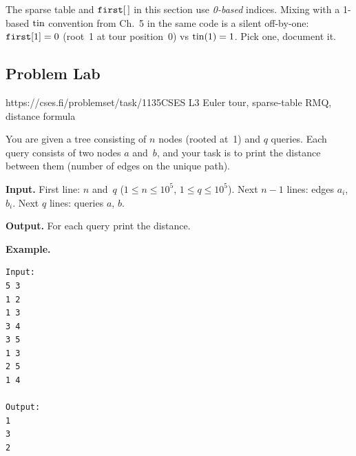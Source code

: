 \begin{warningbox}
The sparse table and \(\texttt{first}[\,]\) in this section use
\emph{0-based} indices.  Mixing with a 1-based \(\operatorname{tin}\) convention from
Ch.~5 in the same code is a silent off-by-one: \(\texttt{first}[1]=0\)
(root~1 at tour position~0) vs \(\operatorname{tin}(1)=1\).  Pick one, document it.
\end{warningbox}

\subsection{Problem Lab}

  {https://cses.fi/problemset/task/1135}{CSES L3}
  {Euler tour, sparse-table RMQ, distance formula}

\begin{problemstatement}
You are given a tree consisting of \(n\) nodes (rooted at~1) and \(q\)
queries.  Each query consists of two nodes \(a\) and~\(b\), and your task
is to print the distance between them (number of edges on the unique
path).

\textbf{Input.} First line: \(n\) and~\(q\)
($1 \le n \le 10^5$, $1 \le q \le 10^5$).  Next \(n-1\) lines: edges
\(a_i\), \(b_i\).  Next \(q\) lines: queries \(a\), \(b\).

\textbf{Output.} For each query print the distance.

\textbf{Example.}
\begin{verbatim}
Input:
5 3
1 2
1 3
3 4
3 5
1 3
2 5
1 4

Output:
1
3
2
\end{verbatim}
\end{problemstatement}

\begin{attemptgate}
\end{attemptgate}

